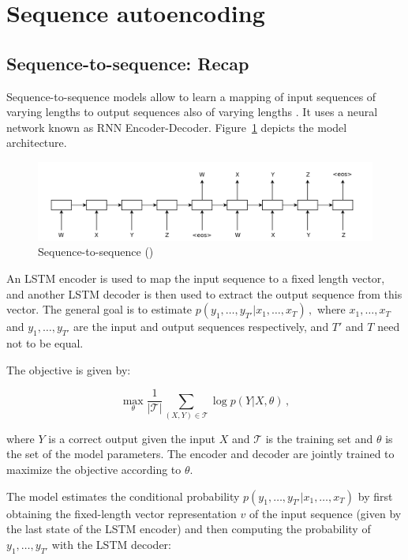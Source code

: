 \documentclass[12pt]{article}\pagestyle{myheadings}
\newcommand{\T}{\mathcal{T}}
\begin{document}
 
\section{Sequence autoencoding}
\subsection{Sequence-to-sequence: Recap} 
Sequence-to-sequence models allow to learn a mapping of input sequences of varying lengths to output sequences also of varying lengths \citep{SutskeverVL14}. It uses a neural network known as RNN Encoder-Decoder. Figure~\ref{fig:seq2seq} depicts the model architecture. 
\begin{figure}[ht]
\centering
\includegraphics[width=1.0\linewidth]{figures/seq2seq.png}
\caption{\label{fig:seq2seq}Sequence-to-sequence (\citet{SutskeverVL14})}
\end{figure}
An LSTM encoder is used to map the input sequence to a fixed length vector, and another LSTM decoder is then used to extract the output sequence from this vector. The general goal is to estimate 
$
p(y_1,\ldots,y_{T'} | x_1, \ldots, x_T)\,,
$
where $x_1, \ldots, x_T$ and  $y_1,\ldots,y_{T'}$ are the input and output sequences respectively, and $T'$ and $T$ need not to be equal. 

The objective is given by:

\begin{equation}
\max_{\theta} \frac{1}{|\T|} \sum_{(X,Y) \in \T} \log p(Y|X,\theta) \,,
\label{eq:seq2seq_obj}
\end{equation}

where $Y$ is a correct output given the input $X$ and $\T$ is the training set and $\theta$ is the set of the model parameters. 
The encoder and decoder are jointly trained to maximize the objective according to $\theta$.

The model estimates the conditional probability $p(y_1,\ldots,y_{T'} | x_1, \ldots, x_T)$ by first obtaining the fixed-length vector representation $v$ of the input sequence (given by the last state of the LSTM encoder) and then computing the probability of $y_1,\ldots,y_{T'} $ with the LSTM decoder: 
\end{document}
